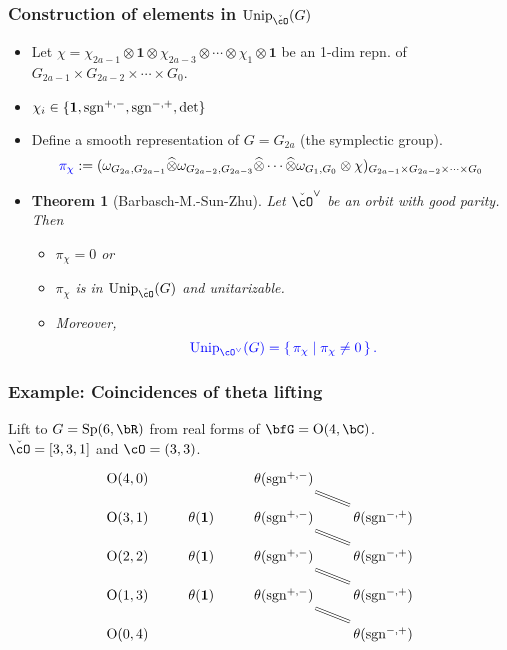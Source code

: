 \documentclass[t,mathserif,11pt,handout,usenames,dvipsnames]{beamer}
\theoremstyle{plain}
\newtheorem{thm}{Theorem}
\theoremstyle{definition}
\newcommand{\rO}{\mathrm{O}}
\newcommand{\bfone}{\mathbf{1}}
\def\sgn{{\rm sgn}}
\def\Sp{{\mathrm{Sp}}}
\def\Unip{{\mathrm{Unip}}}
\def\ckcO{{\check{\cO}}}
\def\lblue{\color{blue}}
\def\vcO{\cO^\vee}
\begin{document}
\begin{frame}[label=CG]
  \frametitle{Construction of elements in $\Unip_{\ckcO}(G)$}
  \begin{itemize}[<+->]
  \item 
  Let $\chi=\chi_{2a-1}\otimes\bfone \otimes
  \chi_{2a-3}\otimes \cdots \otimes \chi_{1}\otimes \bfone$ be an 1-dim repn. 
  of
  $G_{2a-1}\times G_{2a-2}\times \cdots \times G_0$.
  \item $\chi_i \in \{ \bfone, \sgn^{+,-}, \sgn^{-,+},  {\det}\}$
  \item 
  Define a smooth representation of $G = G_{2a}$ (the symplectic group). 
  \[
    {\lblue \pi_{\chi}}:=(\omega_{G_{2a},G_{2a-1}}\widehat \otimes
    \omega_{G_{2a-2},G_{2a-3}} \widehat \otimes \cdots \widehat \otimes
    \omega_{G_1,G_0} \otimes \chi)_{G_{2a-1}\times G_{2a-2}\times \cdots \times G_{0}}
  \]
\item[]
  \begin{thm}[Barbasch-M.-Sun-Zhu]
    Let $\ckcO^\vee$ be an orbit with good parity.
    Then
    \begin{itemize}[<+->]
    \item $\pi_\chi = 0$ or
    \item $\pi_{\chi}$ is in {\lblue $\Unip_{\ckcO}(G)$} and   
    {\lblue unitarizable}.
    \item Moreover, 
  \[\lblue
    \Unip_{\vcO}(G) = \set{\pi_{\chi} | \pi_{\chi}\neq 0}. 
  \]
  \end{itemize}
\end{thm}
\end{itemize}
\end{frame}



\begin{frame}[label=CT]
    \frametitle{Example: Coincidences of theta lifting}
    Lift to $G = \Sp(6,\bR)$ from real forms of $\bfG = \rO(4,\bC)$.\\
    $\ckcO = [3,3,1]$ and  $\cO = (3,3)$.
    \[
      \begin{tikzcd}[ampersand replacement=\&,column sep=2em, row sep=1em]
        \rO(4,0) \& \  \& \theta(\sgn^{+,-}) \ar[dr,equal]\& \   \\
        \rO(3,1) \& \theta(\bfone) \& \theta(\sgn^{+,-}) \ar[dr,equal] \& \theta(\sgn^{-,+}) \\
        \rO(2,2) \& \theta(\bfone) \& \theta(\sgn^{+,-}) \ar[dr,equal] \& \theta(\sgn^{-,+}) \\
        \rO(1,3) \& \theta(\bfone) \& \theta(\sgn^{+,-}) \ar[dr,equal] \& \theta(\sgn^{-,+}) \\
        \rO(0,4) \& \  \&\  \& \theta(\sgn^{-,+}) \\
      \end{tikzcd}
    \]
  \end{frame}
\end{document}
